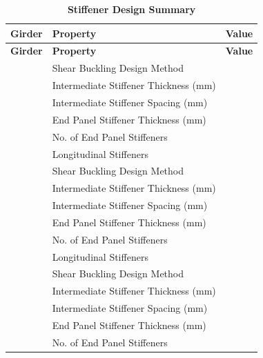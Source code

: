 \documentclass[12pt,a4paper]{report}
\numberwithin{table}{chapter}
\numberwithin{figure}{chapter}
\newcommand{\reportrowpad}{4pt}
\newcommand{\reportsectiongap}{0.75em}
\begin{document}
\vspace{\reportsectiongap}
\begin{longtable}{|C{2.5cm}|L{6.5cm}|>{\arraybackslash}p{6.5cm}|}
\caption{\textbf{Stiffener Design Summary}}\\
\hline
\textbf{Girder} & \textbf{Property} & \textbf{Value} \\
\hline
\endfirsthead
\hline
\textbf{Girder} & \textbf{Property} & \textbf{Value} \\
\hline
\endhead
{} & \textnormal{Shear Buckling Design Method} &  \\[\reportrowpad]
 & \textnormal{Intermediate Stiffener Thickness (mm)} &  \\[\reportrowpad]
 & \textnormal{Intermediate Stiffener Spacing (mm)} &  \\[\reportrowpad]
 & \textnormal{End Panel Stiffener Thickness (mm)} &  \\[\reportrowpad]
 & \textnormal{No. of End Panel Stiffeners} &  \\[\reportrowpad]
 & \textnormal{Longitudinal Stiffeners} &  \\[\reportrowpad]
\hline
{} & \textnormal{Shear Buckling Design Method} &  \\[\reportrowpad]
 & \textnormal{Intermediate Stiffener Thickness (mm)} &  \\[\reportrowpad]
 & \textnormal{Intermediate Stiffener Spacing (mm)} &  \\[\reportrowpad]
 & \textnormal{End Panel Stiffener Thickness (mm)} &  \\[\reportrowpad]
 & \textnormal{No. of End Panel Stiffeners} &  \\[\reportrowpad]
 & \textnormal{Longitudinal Stiffeners} &  \\[\reportrowpad]
\hline
{} & \textnormal{Shear Buckling Design Method} &  \\[\reportrowpad]
 & \textnormal{Intermediate Stiffener Thickness (mm)} &  \\[\reportrowpad]
 & \textnormal{Intermediate Stiffener Spacing (mm)} &  \\[\reportrowpad]
 & \textnormal{End Panel Stiffener Thickness (mm)} &  \\[\reportrowpad]
 & \textnormal{No. of End Panel Stiffeners} &  \\[\reportrowpad]

\end{longtable}
\end{document}
